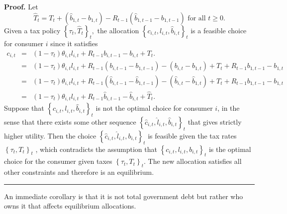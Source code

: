\documentclass[thmsb,11pt]{article}
\newenvironment{proof}[1][Proof]{\noindent \textbf{#1.} }{\  \rule{0.5em}{0.5em}}
\begin{document}
\begin{proof}
Let
\begin{equation}
\hat{T}_{t}=T_{t} + \left(\hat{b}_{1,t} - b_{1,t}\right) -
R_{t-1}\left(\hat{b}_{1,t-1} - b_{1,t-1}\right) \text{ for
all }t\geq 0.  \label{construct That}
\end{equation}%
Given  a tax policy $\left \{ \tau _{t},\hat{T}_{t}\right \} _{t},$ the
allocation $\left \{ c_{i,t},l_{i,t},\hat{b}_{i,t}\right \}
_{t}$ is a feasible choice for consumer $i$ since it satisfies%
\begin{eqnarray*}
c_{i,t}&=&\left( 1-\tau _{t}\right) \theta _{i,t}l_{i,t}+R_{t-1}b_{i,t-1}-b_{i,t}+T_{t}.\\
&=&\left( 1-\tau _{t}\right) \theta _{i,t}l_{i,t}+R_{t-1}\left( b_{i,t-1}-b_{1,t-1}\right) -\left(
b_{i,t}-b_{1,t}\right) +T_{t}+R_{t-1}b_{1,t-1}-b_{1,t} \\
&=&\left( 1-\tau _{t}\right) \theta _{i,t}l_{i,t}+R_{t-1}\left( \hat{b}_{i,t-1}-\hat{b}_{1,t-1}\right) -\left( \hat{b%
}_{i,t}-\hat{b}_{1,t}\right) +T_{t}+R_{t-1}b_{1,t-1}-b_{1,t} \\
 &=&\left( 1-\tau _{t}\right) \theta
_{i,t}l_{i,t}+R_{t-1}\hat{b}_{i,t-1}-\hat{b}_{i,t}+\hat{T}_{t}.
\end{eqnarray*}%
Suppose that $\left \{ c_{i,t},l_{i,t},\hat{b}_{i,t}\right \}
_{t}$ is not the optimal choice for consumer $i$, in the sense that there exists some
other sequence $\left \{ \hat{c}_{i,t},\hat{l}_{i,t},\hat{b}_{i,t}\right \}
_{t}$ that gives strictly higher utility.  Then the choice $%
\left \{ \hat{c}_{i,t},\hat{l}_{i,t},b_{i,t}\right \} _{t}$ is
feasible given the tax rates  $\left \{ \tau _{t},T_{t}\right \} _{t}$%
, which contradicts the assumption that $\left \{ c_{i,t},l_{i,t},b_{i,t}\right \} _{t}$ is the optimal choice for
the consumer given taxes $\left \{ \tau _{t},T_{t}\right \}
_{t}$. The new allocation satisfies all other constraints and
therefore is an equilibrium.
\end{proof}

\smallskip An immediate corollary is  that it is not
total government debt but rather who owns it that affects equilibrium
allocations.
\end{document}
